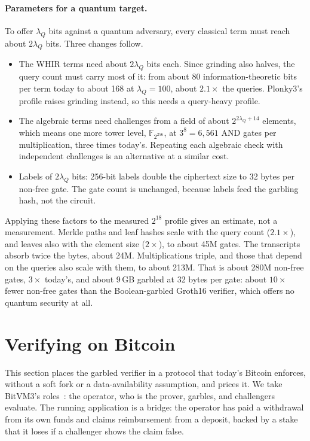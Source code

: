 \documentclass[11pt]{article}
\newcommand{\AND}{\textsf{AND}}
\begin{document}
\paragraph{Parameters for a quantum target.} To offer $\lambda_Q$ bits against a
quantum adversary, every classical term must reach about $2\lambda_Q$ bits.
Three changes follow.
\begin{itemize}
  \item The WHIR terms need about $2\lambda_Q$ bits each. Since grinding also
    halves, the query count must carry most of it: from about 80
    information-theoretic bits per term today to about 168 at $\lambda_Q=100$,
    about $2.1\times$ the queries. Plonky3's profile raises grinding instead,
    so this needs a query-heavy profile.
  \item The algebraic terms need challenges from a field of about
    $2^{2\lambda_Q+14}$ elements, which means one more tower level,
    $\mathbb{F}_{2^{256}}$, at $3^8=6{,}561$ \AND{} gates per multiplication, three
    times today's. Repeating each algebraic check with independent challenges is
    an alternative at a similar cost.
  \item Labels of $2\lambda_Q$ bits: 256-bit labels double the ciphertext size to
    32 bytes per non-free gate. The gate count is unchanged, because labels feed
    the garbling hash, not the circuit.
\end{itemize}
Applying these factors to the measured $2^{18}$ profile gives an estimate, not a
measurement. Merkle paths and leaf hashes scale with the query count ($2.1\times$),
and leaves also with the element size ($2\times$), to about 45M gates. The
transcripts absorb twice the bytes, about 24M. Multiplications triple, and those
that depend on the queries also scale with them, to about 213M. That is about
280M non-free gates, $3\times$ today's, and about 9\,GB garbled at 32 bytes per
gate: about $10\times$ fewer non-free gates than the Boolean-garbled Groth16
verifier, which offers no quantum security at all.

\section{Verifying on Bitcoin}\label{sec:protocol}

This section places the garbled verifier in a protocol that today's Bitcoin
enforces, without a soft fork or a data-availability assumption, and prices it.
We take BitVM3's roles~\cite{bitvm3paper,mosaic26}: the operator, who is the
prover, garbles, and challengers evaluate. The running application is a bridge:
the operator has paid a withdrawal from its own funds and claims reimbursement
from a deposit, backed by a stake that it loses if a challenger shows the claim
false.
\end{document}
